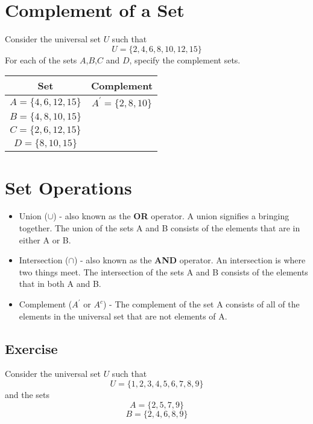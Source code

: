 \documentclass[a4paper,12pt]{article}
\begin{document}
\section*{Complement of a Set}
Consider the universal set $U$ such that
\[U=\{2,4,6,8,10,12,15\} \]
For each of the sets $A$,$B$,$C$ and $D$, specify the complement sets.
{
	\LARGE
\begin{center}
\begin{tabular}{|c|c|}
  \hline
Set &\phantom{sp} Complement \phantom{sp}\\
\hline \phantom{sp} $A=\{4,6,12,15\}$ \phantom{sp} &
$A^{\prime}=\{2,8,10\}$ \\ \hline $B=\{4,8,10,15\}$ & \\ \hline
$C=\{2,6,12,15\}$ & \\ \hline $D=\{8,10,15\}$ & \\ \hline

\end{tabular}
\end{center}
}

\newpage
\section*{Set Operations}
\begin{itemize}
	\item Union ($\cup$) - also known as the \textbf{OR} operator. A union signifies a bringing together. The union of the sets A and B consists of the elements that are in either A or B.
	\item Intersection ($\cap$) - also known as the \textbf{AND} operator. An intersection is where two things meet. The intersection of the sets A and B consists of the elements that in both A and B.
	\item Complement ($A^{\prime}$ or $A^{c}$) - The complement of the set A consists of all of the elements in the universal set that are not elements of A.
\end{itemize}

\subsection*{Exercise}
Consider the universal set $U$ such that
\[U=\{1,2,3,4,5,6,7,8,9\} \] 
and the sets
\[A=\{2,5,7,9\} \] 
\[B=\{2,4,6,8,9\} \]
\end{document}
